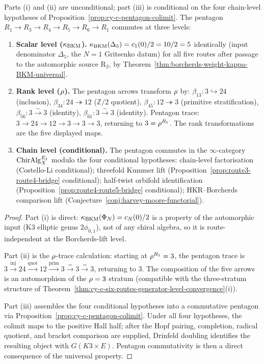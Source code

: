 \begin{proposition}
\label{prop:pentagon-commutativity-three-level}
Parts (i) and (ii) are unconditional; part (iii) is conditional on the four chain-level hypotheses of
Proposition~\ref{prop:cy-c-pentagon-colimit}. The pentagon $R_1 \to R_3 \to R_4 \to R_5 \to R_6 \to R_1$
commutes at three levels:
\begin{enumerate}[label=\textup{(\roman*)}]
 \item \textbf{Scalar level ($\kappa_{\mathrm{BKM}}$).} $\kappa_{\mathrm{BKM}}(\Delta_5) = c_1(0)/2 = 10/2 = 5$ identically (input denominator $\Delta_5$, the $N = 1$ Gritsenko datum) for all five routes after
 passage to the automorphic source R$_2$, by
 Theorem~\ref{thm:borcherds-weight-kappa-BKM-universal}.
 \item \textbf{Rank level ($\rho$).} The pentagon arrows transform $\rho$ by: $\beta_{13}: 3 \hookrightarrow 24$
 (inclusion), $\beta_{34}: 24 \twoheadrightarrow 12$ ($\mathbb{Z}/2$ quotient), $\beta_{45}: 12 \twoheadrightarrow 3$
 (primitive stratification), $\beta_{56}: 3 \xrightarrow{\sim} 3$ (identity), $\beta_{61}: 3 \xrightarrow{\sim} 3$
 (identity). Pentagon trace: $3 \to 24 \to 12 \to 3 \to 3 \to 3$, returning to $3 = \rho^{R_1}$.
 The rank transformations are the five displayed maps.
 \item \textbf{Chain level (conditional).} The pentagon commutes in the $\infty$-category
 $\mathrm{ChirAlg}^{E_{1}}_X$ modulo the four conditional hypotheses: chain-level
 factorisation (Costello-Li conditional); threefold Kummer lift (Proposition~\ref{prop:route3-route4-bridge}
 conditional); half-twist orbifold identification (Proposition~\ref{prop:route4-route5-bridge}
 conditional); HKR--Borcherds comparison lift (Conjecture~\ref{conj:harvey-moore-functorial}).
\end{enumerate}
\end{proposition}

\begin{proof}
Part (i) is direct: $\kappa_{\mathrm{BKM}}(\Phi_N) = c_N(0)/2$ is a property of the automorphic input (K3 elliptic
genus $2\phi_{0, 1}$), not of any chiral algebra, so it is route-independent at the Borcherds-lift level.

Part (ii) is the $\rho$-trace calculation: starting at $\rho^{R_1} = 3$, the pentagon trace is
$3 \xrightarrow{\text{inj}} 24 \xrightarrow{\text{quot}} 12 \xrightarrow{\text{prim}} 3 \xrightarrow{=} 3 \xrightarrow{=} 3$,
returning to $3$. The composition of the five arrows is an automorphism of the $\rho = 3$ stratum (compatible
with the three-stratum structure of Theorem~\ref{thm:cy-c-six-routes-generator-level-convergence}(i)).

Part (iii) assembles the four conditional hypotheses into a commutative pentagon via Proposition~\ref{prop:cy-c-pentagon-colimit}.
Under all four hypotheses, the colimit maps to the positive Hall half; after the Hopf pairing, completion,
radical quotient, and bracket comparison are supplied, Drinfeld doubling identifies the resulting object with
\(G(K3 \times E)\). Pentagon commutativity is then a direct consequence of the universal property.
\end{proof}

